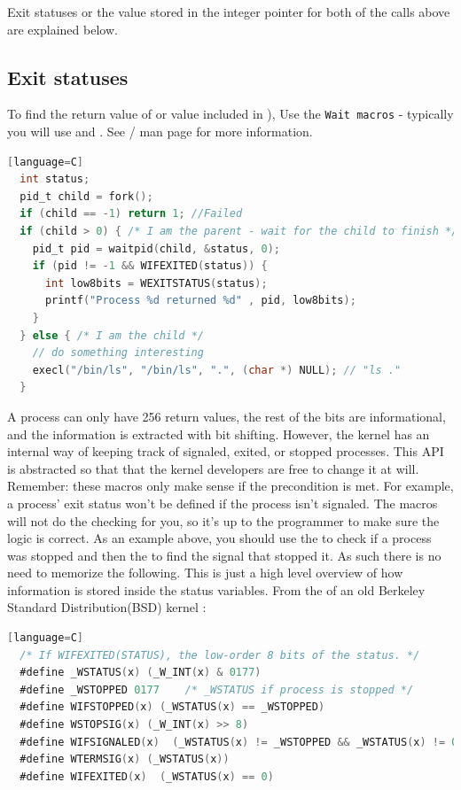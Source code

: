 \begin{itemize}
Exit statuses or the value stored in the integer pointer for both of the calls above are explained below.

\subsection{Exit statuses}

To find the return value of  or value included in ), Use the \texttt{Wait macros} - typically you will use  and  .
See / man page for more information.

\begin{lstlisting}[language=C][language=C]
  int status;
  pid_t child = fork();
  if (child == -1) return 1; //Failed
  if (child > 0) { /* I am the parent - wait for the child to finish */
    pid_t pid = waitpid(child, &status, 0);
    if (pid != -1 && WIFEXITED(status)) {
      int low8bits = WEXITSTATUS(status);
      printf("Process %d returned %d" , pid, low8bits);
    }
  } else { /* I am the child */
    // do something interesting
    execl("/bin/ls", "/bin/ls", ".", (char *) NULL); // "ls ."
  }
\end{lstlisting}

A process can only have 256 return values, the rest of the bits are informational, and the information is extracted with bit shifting.
However, the kernel has an internal way of keeping track of signaled, exited, or stopped processes.
This API is abstracted so that that the kernel developers are free to change it at will.
Remember: these macros only make sense if the precondition is met.
For example, a process' exit status won't be defined if the process isn't signaled.
The macros will not do the checking for you, so it's up to the programmer to make sure the logic is correct.
As an example above, you should use the  to check if a process was stopped and then the  to find the signal that stopped it.
As such there is no need to memorize the following. This is just a high level overview of how information is stored inside the status variables. From the  of an old Berkeley Standard Distribution(BSD) kernel \cite{sys/wait.h}:

\begin{lstlisting}[language=C][language=C]
  /* If WIFEXITED(STATUS), the low-order 8 bits of the status. */
  #define _WSTATUS(x) (_W_INT(x) & 0177)
  #define _WSTOPPED 0177    /* _WSTATUS if process is stopped */
  #define WIFSTOPPED(x) (_WSTATUS(x) == _WSTOPPED)
  #define WSTOPSIG(x) (_W_INT(x) >> 8)
  #define WIFSIGNALED(x)  (_WSTATUS(x) != _WSTOPPED && _WSTATUS(x) != 0)
  #define WTERMSIG(x) (_WSTATUS(x))
  #define WIFEXITED(x)  (_WSTATUS(x) == 0)
\end{lstlisting}


\end{itemize}
